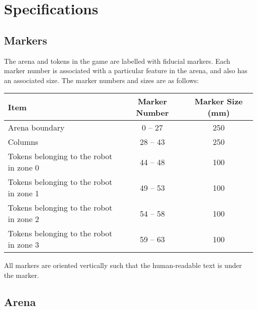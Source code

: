 \section{Specifications}
\label{sec:specs}

\subsection{Markers}
\label{spec:markers}

The arena and tokens in the game are labelled with fiducial
markers. Each marker number is associated with a particular feature in the
arena, and also has an associated size. The marker numbers and sizes are as
follows:

\begin{center}
\begin{tabular}{lcc}
  \toprule
  \textbf{Item} & \textbf{Marker Number} & \textbf{Marker Size (\si{mm})} \\
  \midrule
  Arena boundary & 0 -- 27 & 250 \\
  Columns & 28 -- 43 & 250 \\
  Tokens belonging to the robot in zone 0 & 44 -- 48 & 100 \\
  Tokens belonging to the robot in zone 1 & 49 -- 53 & 100 \\
  Tokens belonging to the robot in zone 2 & 54 -- 58 & 100 \\
  Tokens belonging to the robot in zone 3 & 59 -- 63 & 100 \\
  \bottomrule
\end{tabular}
\end{center}

All markers are oriented vertically such that the human-readable text
is under the marker.

\subsection{Arena}
\label{spec:arena}

